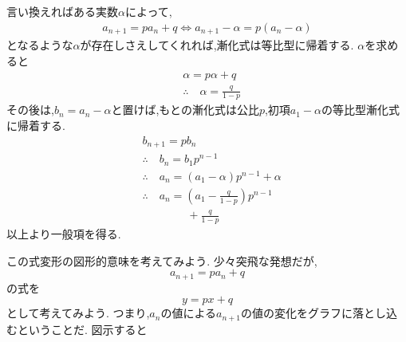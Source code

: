   言い換えればある実数$\alpha$によって,
  \begin{align*}
    a_{n+1}=pa_n+q \iff a_{n+1}-\alpha=p(a_n-\alpha)
  \end{align*}
  となるような$\alpha$が存在しさえしてくれれば,漸化式は等比型に帰着する.
  $\alpha$を求めると
  \begin{align*}
    &\alpha=p\alpha+q\\
    &\therefore \quad \alpha=\frac{q}{1-p}
  \end{align*}
  その後は,$b_n=a_n-\alpha$と置けば,もとの漸化式は公比$p$,初項$a_1-\alpha$の等比型漸化式に帰着する.
  \begin{align*}
    &b_{n+1}=pb_n\\
    &\therefore \quad b_n=b_1p^{n-1}\\
     &\therefore \quad a_n=(a_1-\alpha)p^{n-1}+\alpha\\
     &\therefore \quad a_n=(a_1-\frac{q}{1-p})p^{n-1}\\
     &\qquad\qquad+\frac{q}{1-p}
  \end{align*}
  以上より一般項を得る.
  
  この式変形の図形的意味を考えてみよう.
  少々突飛な発想だが,
  \[
    a_{n+1}=pa_n+q
  \]
  の式を
  \[
    y=px+q
  \]
  として考えてみよう.
  つまり,$a_n$の値による$a_{n+1}$の値の変化をグラフに落とし込むということだ.
  図示すると
  \begin{center}
  \end{center}
  \begin{center}
  \end{center}

